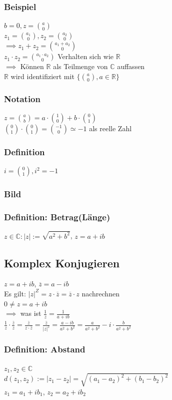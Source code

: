 \documentclass[fleqn]{scrbook}
\begin{document}
\subsubsection{Beispiel}
$b=0,z=\binom{a}{0}$\\$z_1=\binom{a_1}{0},z_2 = \binom{a_2}{0}$\\
$\implies z_1 + z_2 = \binom{a_1+a_2}{0}$\\
$z_1  \cdot  z_2 = \binom{a_1  \cdot  a_2}{0}$ Verhalten sich wie $\mathbb{R}$\\
$\implies$ Können $\mathbb{R}$ als Teilmenge von $\mathbb{C}$ auffassen\\
$\mathbb{R}$ wird identifiziert mit $\{\binom{a}{0}, a \in \mathbb{R}\}$
\subsubsection{Notation}
$z=\binom{a}{b}=a \cdot \binom{1}{0}+b \cdot \binom{0}{1}$\\
$\binom{0}{1}  \cdot  \binom{0}{1} = \binom{-1}{0} \simeq -1$ als reelle Zahl
\subsubsection{Definition} $i = \binom{0}{1}, i^2 = -1$
\subsubsection{Bild}
\subsubsection{Definition: Betrag(Länge)} 
$z \in \mathbb{C}:|z|:=\sqrt{a^2 + b^2}$, $z=a+ib$
\subsection{Komplex Konjugieren} $z = a+ib$, $\overline{z} = a - ib$\\
Es gilt: $|z|^Z = z  \cdot  \overline{z} = \overline{z}  \cdot  z$ nachrechnen\\
$0 \neq z = a + ib$\\
$\implies$ was ist $\frac{1}{z} = \frac{1}{a+ib}$\\
$\frac{1}{z}  \cdot  \frac{\overline{z}}{z} = \frac{\overline{z}}{z  \cdot  \overline{z}} = \frac{\overline{z}}{|z|^z} = \frac{a-ib}{a^2 + b^2} = \frac{a}{a^2 + b^2} - i \cdot \frac{b}{a^2 + b^2}$
\subsubsection{Definition: Abstand} $z_1, z_2 \in \mathbb{C}$\\
$d(z_1,z_2) := |z_1 - z_2| = \sqrt{(a_1 - a_2)^2 + (b_1 - b_2)^2}$\\
$z_1 = a_1 + ib_1$, $z_2 = a_2 + ib_2$
\end{document}
